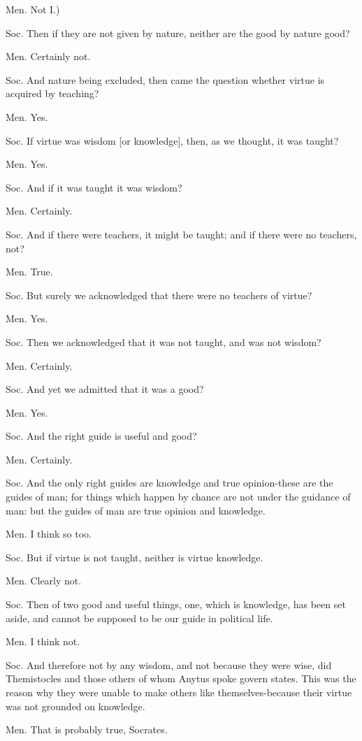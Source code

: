 Men. Not I.) 

Soc. Then if they are not given by nature, neither are the good by
nature good? 

Men. Certainly not. 

Soc. And nature being excluded, then came the question whether virtue
is acquired by teaching? 

Men. Yes. 

Soc. If virtue was wisdom [or knowledge], then, as we thought, it
was taught? 

Men. Yes. 

Soc. And if it was taught it was wisdom? 

Men. Certainly. 

Soc. And if there were teachers, it might be taught; and if there
were no teachers, not? 

Men. True. 

Soc. But surely we acknowledged that there were no teachers of virtue?

Men. Yes. 

Soc. Then we acknowledged that it was not taught, and was not wisdom?

Men. Certainly. 

Soc. And yet we admitted that it was a good? 

Men. Yes. 

Soc. And the right guide is useful and good? 

Men. Certainly. 

Soc. And the only right guides are knowledge and true opinion-these
are the guides of man; for things which happen by chance are not under
the guidance of man: but the guides of man are true opinion and knowledge.

Men. I think so too. 

Soc. But if virtue is not taught, neither is virtue knowledge.

Men. Clearly not. 

Soc. Then of two good and useful things, one, which is knowledge,
has been set aside, and cannot be supposed to be our guide in political
life. 

Men. I think not. 

Soc. And therefore not by any wisdom, and not because they were wise,
did Themistocles and those others of whom Anytus spoke govern states.
This was the reason why they were unable to make others like themselves-because
their virtue was not grounded on knowledge. 

Men. That is probably true, Socrates. 

